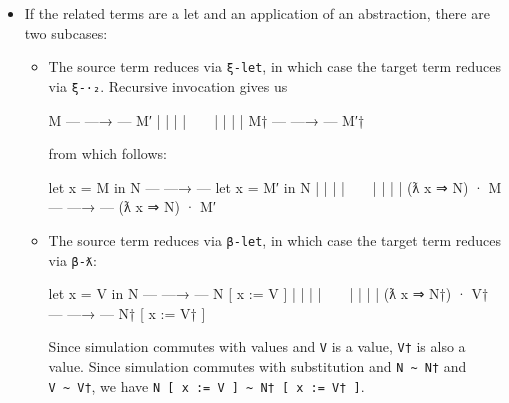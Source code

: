\begin{itemize}
\begin{itemize}
    \begin{myDisplay}
     (ƛ x ⇒ N) · V  --- —→ ---  N [ x := V ]
          |                           |
          |                           |
          ~                           ~
          |                           |
          |                           |
    (ƛ x ⇒ N†) · V† --- —→ --- N† [ x :=  V† ]
    \end{myDisplay}

    Since simulation commutes with values and \texttt{V} is a value,
    \texttt{V†} is also a value. Since simulation commutes with
    substitution and \texttt{N\ \textasciitilde{}\ N†} and
    \texttt{V\ \textasciitilde{}\ V†}, we have
    \texttt{N\ {[}\ x\ :=\ V\ {]}\ \textasciitilde{}\ N†\ {[}\ x\ :=\ V†\ {]}}.
  \end{itemize}
\item
  If the related terms are a let and an application of an abstraction,
  there are two subcases:

  \begin{itemize}
  \item
    The source term reduces via \texttt{ξ-let}, in which case the target
    term reduces via \texttt{ξ-·₂}. Recursive invocation gives us

    \begin{myDisplay}
    M  --- —→ ---  M′
    |              |
    |              |
    ~              ~
    |              |
    |              |
    M† --- —→ --- M′†
    \end{myDisplay}

    from which follows:

    \begin{myDisplay}
    let x = M in N --- —→ --- let x = M′ in N
          |                         |
          |                         |
          ~                         ~
          |                         |
          |                         |
    (ƛ x ⇒ N) · M  --- —→ --- (ƛ x ⇒ N) · M′
    \end{myDisplay}
  \item
    The source term reduces via \texttt{β-let}, in which case the target
    term reduces via \texttt{β-ƛ}:

    \begin{myDisplay}
    let x = V in N  --- —→ ---  N [ x := V ]
          |                         |
          |                         |
          ~                         ~
          |                         |
          |                         |
    (ƛ x ⇒ N†) · V† --- —→ --- N† [ x := V† ]
    \end{myDisplay}

    Since simulation commutes with values and \texttt{V} is a value,
    \texttt{V†} is also a value. Since simulation commutes with
    substitution and \texttt{N\ \textasciitilde{}\ N†} and
    \texttt{V\ \textasciitilde{}\ V†}, we have
    \texttt{N\ {[}\ x\ :=\ V\ {]}\ \textasciitilde{}\ N†\ {[}\ x\ :=\ V†\ {]}}.
  \end{itemize}
\end{itemize}

